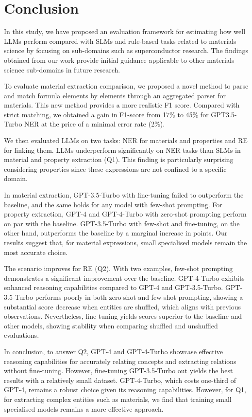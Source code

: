 \section{Conclusion}

In this study, we have proposed an evaluation framework for estimating how well LLMs perform compared with SLMs and rule-based tasks related to materials science by focusing on sub-domains such as superconductor research. The findings obtained from our work provide initial guidance applicable to other materials science sub-domains in future research.

To evaluate material extraction comparison, we proposed a novel method to parse and match formula elements by elements through an aggregated parser for materials. 
This new method provides a more realistic F1 score. Compared with strict matching, we obtained a gain in F1-score from 17\% to 45\% for GPT3.5-Turbo NER at the price of a minimal error rate (2\%). 

We then evaluated LLMs on two tasks: NER for materials and properties and RE for linking them. LLMs underperform significantly on NER tasks than SLMs in material and property extraction (Q1). This finding is particularly surprising considering properties since these expressions are not confined to a specific domain.

In material extraction, GPT-3.5-Turbo with fine-tuning failed to outperform the baseline, and the same holds for any model with few-shot prompting. 
For property extraction, GPT-4 and GPT-4-Turbo with zero-shot prompting perform on par with the baseline. GPT-3.5-Turbo with few-shot and fine-tuning, on the other hand, outperforms the baseline by a marginal increase in points.
Our results suggest that, for material expressions, small specialised models remain the most accurate choice.

The scenario improves for RE (Q2).
With two examples, few-shot prompting demonstrates a significant improvement over the baseline.
GPT-4-Turbo exhibits enhanced reasoning capabilities compared to GPT-4 and GPT-3.5-Turbo.
GPT-3.5-Turbo performs poorly in both zero-shot and few-shot prompting, showing a substantial score decrease when entities are shuffled, which aligns with previous observations.
Nevertheless, fine-tuning yields scores superior to the baseline and other models, showing stability when comparing shuffled and unshuffled evaluations.

In conclusion, to answer Q2, GPT-4 and GPT-4-Turbo showcase effective reasoning capabilities for accurately relating concepts and extracting relations without fine-tuning. However, fine-tuning GPT-3.5-Turbo out yields the best results with a relatively small dataset. 
GPT-4-Turbo, which costs one-third of GPT-4, remains a robust choice given its reasoning capabilities. 
However, for Q1, for extracting complex entities such as materials, we find that training small specialised models remains a more effective approach.

